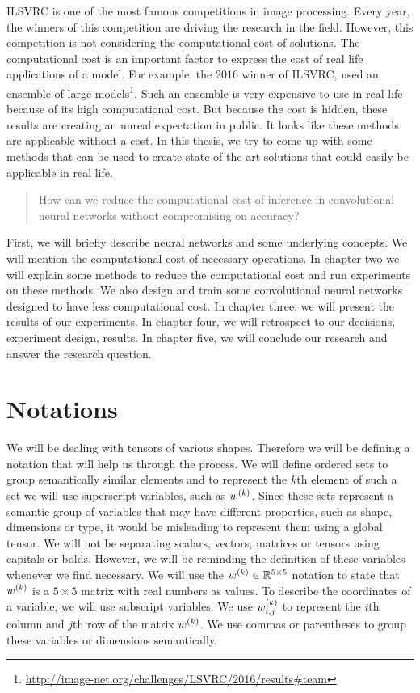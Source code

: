ILSVRC is one of the most famous competitions in image processing. Every year, the winners of this competition are driving the research in the field. However, this competition is not considering the computational cost of solutions. The computational cost is an important factor to express the cost of real life applications of a model. For example, the 2016 winner of ILSVRC, used an ensemble of large models\footnote{\url{http://image-net.org/challenges/LSVRC/2016/results\#team}}. Such an ensemble is very expensive to use in real life because of its high computational cost. But because the cost is hidden, these results are creating an unreal expectation in public. It looks like these methods are applicable without a cost. In this thesis, we try to come up with some methods that can be used to create state of the art solutions that could easily be applicable in real life. %

\begin{quote}
How can we reduce the computational cost of inference in convolutional neural networks without compromising on accuracy?
\end{quote}

First, we will briefly describe neural networks and some underlying concepts. We will mention the computational cost of necessary operations. In chapter two we will explain some methods to reduce the computational cost and run experiments on these methods. We also design and train some convolutional neural networks designed to have less computational cost. In chapter three, we will present the results of our experiments. In chapter four, we will retrospect to our decisions, experiment design, results. In chapter five, we will conclude our research and answer the research question.


\section{Notations}
We will be dealing with tensors of various shapes. Therefore we will be defining a notation that will help us through the process. We will define ordered sets to group semantically similar elements and to represent the $k$th element of such a set we will use superscript variables, such as $w^{(k)}$. Since these sets represent a semantic group of variables that may have different properties, such as shape, dimensions or type, it would be misleading to represent them using a global tensor. We will not be separating scalars, vectors, matrices or tensors using capitals or bolds. However, we will be reminding the definition of these variables whenever we find necessary. We will use the $w^{(k)} \in \mathbb{R}^{5 \times 5}$ notation to state that $w^{(k)}$ is a $5 \times 5$ matrix with real numbers as values. To describe the coordinates of a variable, we will use subscript variables. We use $w^{(k)}_{i,j}$ to represent the $i$th column and $j$th row of the matrix $w^{(k)}$. We use commas or parentheses to group these variables or dimensions semantically. 
